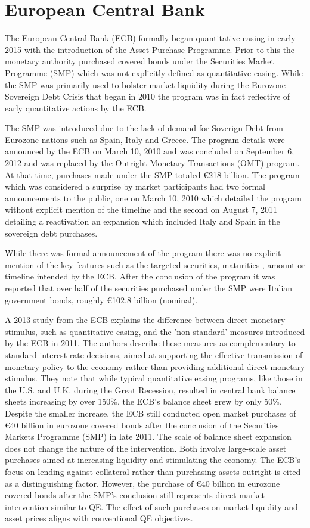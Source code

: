 \section{European Central Bank}

The European Central Bank (ECB) formally began quantitative easing in early 2015 with the introduction of the Asset Purchase Programme. Prior to this the monetary authority purchased covered bonds under the Securities Market Programme (SMP) which was not explicitly defined as quantitative easing. While the SMP was primarily used to bolster market liquidity during the Eurozone Sovereign Debt Crisis that began in 2010 the program was in fact reflective of early quantitative actions by the ECB.

The SMP was introduced due to the lack of demand for Soverign Debt from Eurozone nations such as Spain, Italy and Greece. The program details were announced by the ECB on March 10, 2010 and was concluded on September 6, 2012 and was replaced by the Outright Monetary Transactions (OMT) program. At that time, purchases made under the SMP totaled €218 billion. The program which was considered a surprise by market participants had two formal announcements to the public, one on March 10, 2010 which detailed the program without explicit mention of the timeline and the second on August 7, 2011 detailing a reactivation an expansion which included Italy and Spain in the sovereign debt purchases.  

While there was formal announcement of the program there was no explicit mention of the key features such as the targeted securities, maturities , amount or timeline intended by the ECB. After the conclusion of the program it was reported that over half of the securities purchased under the SMP were Italian government bonds, roughly €102.8 billion (nominal).

A 2013 study from the ECB explains the difference between direct monetary stimulus, such as quantitative easing, and the 'non-standard' measures introduced by the ECB in 2011. The authors describe these measures as complementary to standard interest rate decisions, aimed at supporting the effective transmission of monetary policy to the economy rather than providing additional direct monetary stimulus. They note that while typical quantitative easing programs, like those in the U.S. and U.K. during the Great Recession, resulted in central bank balance sheets increasing by over 150\%, the ECB's balance sheet grew by only 50\%. Despite the smaller increase, the ECB still conducted open market purchases of €40 billion in eurozone covered bonds after the conclusion of the Securities Markets Programme (SMP) in late 2011. The scale of balance sheet expansion does not change the nature of the intervention. Both involve large-scale asset purchases aimed at increasing liquidity and stimulating the economy. The ECB's focus on lending against collateral rather than purchasing assets outright is cited as a distinguishing factor. However, the purchase of €40 billion in eurozone covered bonds after the SMP's conclusion still represents direct market intervention similar to QE. The effect of such purchases on market liquidity and asset prices aligns with conventional QE objectives. 


